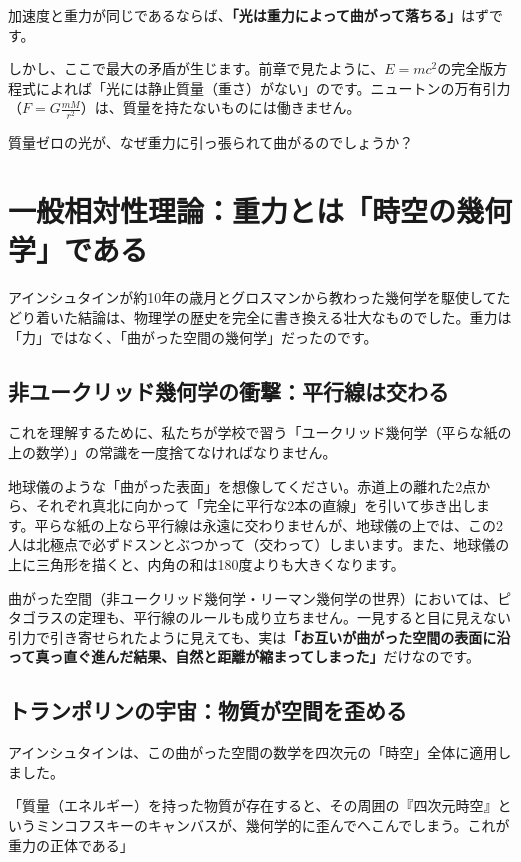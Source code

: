 加速度と重力が同じであるならば、\textbf{「光は重力によって曲がって落ちる」}はずです。

しかし、ここで最大の矛盾が生じます。前章で見たように、\(E=mc^2\)の完全版方程式によれば「光には静止質量（重さ）がない」のです。ニュートンの万有引力（\(F=G\frac{mM}{r^2}\)）は、質量を持たないものには働きません。

質量ゼロの光が、なぜ重力に引っ張られて曲がるのでしょうか？

\section{一般相対性理論：重力とは「時空の幾何学」である}

アインシュタインが約10年の歳月とグロスマンから教わった幾何学を駆使してたどり着いた結論は、物理学の歴史を完全に書き換える壮大なものでした。重力は「力」ではなく、「曲がった空間の幾何学」だったのです。

\subsection{非ユークリッド幾何学の衝撃：平行線は交わる}

これを理解するために、私たちが学校で習う「ユークリッド幾何学（平らな紙の上の数学）」の常識を一度捨てなければなりません。

地球儀のような「曲がった表面」を想像してください。赤道上の離れた2点から、それぞれ真北に向かって「完全に平行な2本の直線」を引いて歩き出します。平らな紙の上なら平行線は永遠に交わりませんが、地球儀の上では、この2人は北極点で必ずドスンとぶつかって（交わって）しまいます。また、地球儀の上に三角形を描くと、内角の和は180度よりも大きくなります。

曲がった空間（非ユークリッド幾何学・リーマン幾何学の世界）においては、ピタゴラスの定理も、平行線のルールも成り立ちません。一見すると目に見えない引力で引き寄せられたように見えても、実は\textbf{「お互いが曲がった空間の表面に沿って真っ直ぐ進んだ結果、自然と距離が縮まってしまった」}だけなのです。

\subsection{トランポリンの宇宙：物質が空間を歪める}

アインシュタインは、この曲がった空間の数学を四次元の「時空」全体に適用しました。

「質量（エネルギー）を持った物質が存在すると、その周囲の『四次元時空』というミンコフスキーのキャンバスが、幾何学的に歪んでへこんでしまう。これが重力の正体である」

